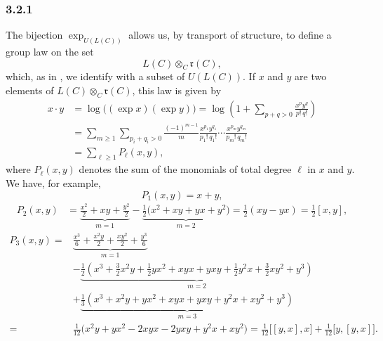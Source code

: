 
\subsubsection*{3.2.1}
\label{sga3:VIIB:3.2.1}

The bijection \(\exp_{U(L(C))}\) allows us, by transport of
structure, to define a group law on the set
\[
  L(C)\otimes_C\mathfrak r(C),
\]
which, as in , we identify with a subset of \(U(L(C))\). If
\(x\) and \(y\) are two elements of
\(L(C)\otimes_C\mathfrak r(C)\), this law is given by
\label{sga3:VIIB:3.2.1:transported-product}
\[
\begin{aligned}
  x\mathbin{\cdot}y
  &=
  \log\bigl((\exp x)(\exp y)\bigr)
  =
  \log\left(
    1+\sum_{p+q>0}\frac{x^p y^q}{p!\,q!}
  \right)
  \\
  &=
  \sum_{m\geq1}
  \sum_{p_i+q_i>0}
  \frac{(-1)^{m-1}}{m}
  \frac{x^{p_1}y^{q_1}}{p_1!\,q_1!}
  \cdots
  \frac{x^{p_m}y^{q_m}}{p_m!\,q_m!}
  \\
  &=
  \sum_{\ell\geq1}P_\ell(x,y),
\end{aligned}
\]
where \(P_\ell(x,y)\) denotes the sum of the monomials of total degree
\(\ell\) in \(x\) and \(y\). We have, for example,
\[
  P_1(x,y)=x+y,
\]
\[
\begin{aligned}
  P_2(x,y)
  &=
  \underbrace{
    \frac{x^2}{2}+xy+\frac{y^2}{2}
  }_{m=1}
  -
  \underbrace{
    \frac12\bigl(x^2+xy+yx+y^2\bigr)
  }_{m=2}
  =
  \frac12(xy-yx)
  =
  \frac12[x,y],
\end{aligned}
\]
\label{sga3:VIIB:3.2.1:P3}
\[
\begin{aligned}
  P_3(x,y)
  ={}&
  \underbrace{
    \frac{x^3}{6}
    +\frac{x^2y}{2}
    +\frac{xy^2}{2}
    +\frac{y^3}{6}
  }_{m=1}
  \\
  &-
  \underbrace{
    \frac12\left(
      x^3+\frac32x^2y+\frac12yx^2+xyx+yxy
      +\frac12y^2x+\frac32xy^2+y^3
    \right)
  }_{m=2}
  \\
  &+
  \underbrace{
    \frac13\left(
      x^3+x^2y+yx^2+xyx+yxy+y^2x+xy^2+y^3
    \right)
  }_{m=3}
  \\
  ={}&
  \frac1{12}
  \bigl(
    x^2y+yx^2-2xyx-2yxy+y^2x+xy^2
  \bigr)
  =
  \frac1{12}\bigl[[y,x],x\bigr]+\frac1{12}\bigl[y,[y,x]\bigr].
\end{aligned}
\]

